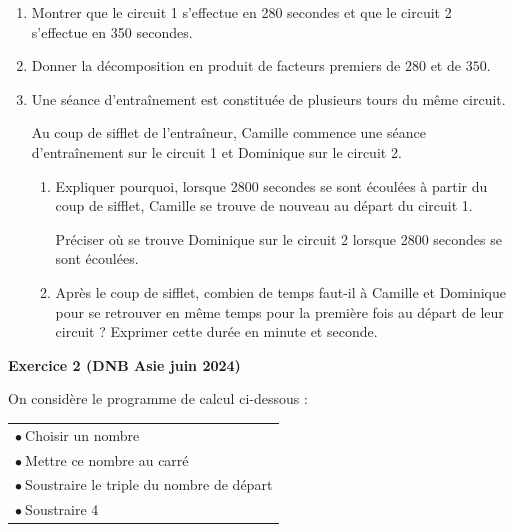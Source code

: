 \documentclass{article}
\begin{document}
\begin{enumerate}
\item Montrer que le circuit 1 s'effectue en 280 secondes et que le circuit 2 s'effectue en 350 secondes.
\item Donner la décomposition en produit de facteurs premiers de $280$ et de $350$.
\item Une séance d'entraînement est constituée de plusieurs tours du même circuit.

Au coup de sifflet de l'entraîneur, Camille commence une séance d'entraînement sur le circuit 1 et Dominique sur le circuit 2.

	\begin{enumerate}
		\item Expliquer pourquoi, lorsque \num{2800} secondes se sont écoulées à partir du coup de sifflet, Camille se trouve de nouveau au départ du circuit 1.

		Préciser où se trouve Dominique sur le circuit 2 lorsque \num{2800} secondes se sont écoulées.

		\item Après le coup de sifflet, combien de temps faut-il à Camille et Dominique pour se retrouver en même temps pour la première fois au départ de leur circuit ? Exprimer cette durée en minute et seconde.
	\end{enumerate}
\end{enumerate}

\newpage\textbf{Exercice 2 (DNB Asie juin 2024)}

\medskip

On considère le programme de calcul ci-dessous :

\begin{center}
\begin{tabular}{|l|}\hline
$\bullet~$Choisir un nombre\\
$\bullet~$Mettre ce nombre au carré\\
$\bullet~$Soustraire le triple du nombre de départ\\
$\bullet~$Soustraire 4\\ \hline
\end{tabular}
\end{center}

\smallskip
\end{document}
